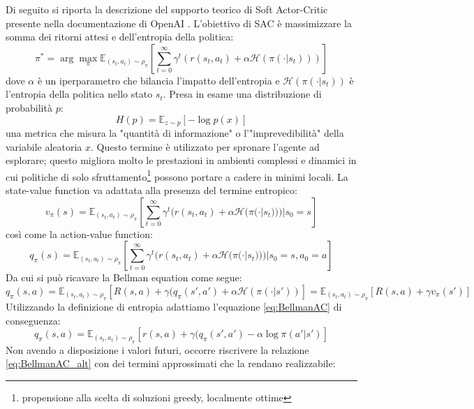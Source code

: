 Di seguito si riporta la descrizione del supporto teorico di Soft Actor-Critic presente nella documentazione di OpenAI \cite{openaiSAC2023}. L'obiettivo di SAC è massimizzare la somma dei ritorni attesi e dell'entropia della politica:
\begin{equation}
    \pi^*= \arg \max_\pi \mathbb{E}_{(s_t,a_t)\sim \rho_\pi}[\sum_{t=0}^\infty\gamma^t (r(s_t,a_t)+ \alpha \mathcal{H}(\pi(\cdot|s_t)))]
\end{equation}
dove $\alpha$ è un iperparametro che bilancia l'impatto dell'entropia e $\mathcal{H}(\pi(\cdot|s_t))$ è l'entropia della politica nello stato $s_t$. Presa in esame una distribuzione di probabilità $p$:
\begin{equation}
    H(p)= \mathbb{E}_{z\sim p}[-\log p(x)]
\end{equation}
una metrica che misura la "quantità di informazione" o l'"imprevedibilità" della variabile aleatoria $x$. Questo termine è utilizzato per spronare l'agente ad esplorare; questo migliora molto le prestazioni in ambienti complessi e dinamici in cui politiche di solo sfruttamento\footnote{propensione alla scelta di soluzioni greedy, localmente ottime} possono portare a cadere in minimi locali. La state-value function va adattata alla presenza del termine entropico:
\begin{equation}
    v_\pi(s)= \mathbb{E}_{(s_t,a_t)\sim \rho_\pi}[\sum_{t=0}^\infty \gamma^t(r(s_t,a_t)+ \alpha \mathcal{H}(\pi(\cdot|s_t)))|s_0=s]
\end{equation}
così come la action-value function:
\begin{equation}
    q_\pi(s)= \mathbb{E}_{(s_t,a_t)\sim \rho_\pi}[\sum_{t=0}^\infty \gamma^t(r(s_t,a_t)+ \alpha \mathcal{H}(\pi(\cdot|s_t)))|s_0=s,a_0=a]
\end{equation}
Da cui si può ricavare la Bellman equation come segue:
\begin{equation}
    q_\pi(s,a) =  \mathbb{E}_{(s_t,a_t)\sim \rho_\pi}[R(s,a)+\gamma(q_\pi(s',a')+\alpha \mathcal{H}(\pi(\cdot|s'))]= \mathbb{E}_{(s_t,a_t)\sim \rho_\pi}[R(s,a)+\gamma v_\pi(s')]
    \label{eq:BellmanAC}
\end{equation}
Utilizzando la definizione di entropia adattiamo l'equazione \ref{eq:BellmanAC} di conseguenza:
\begin{equation}
    q_\pi(s,a) =  \mathbb{E}_{(s_t,a_t)\sim \rho_\pi}[r(s,a)+\gamma(q_\pi(s',a')-\alpha \log\pi(a'|s')]
    \label{eq:BellmanAC_alt}
\end{equation}
Non avendo a disposizione i valori futuri, occorre riscrivere la relazione \ref{eq:BellmanAC_alt} con dei termini approssimati che la rendano realizzabile:
